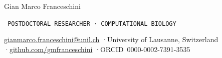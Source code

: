\documentclass[9.5pt, a4paper]{article}
\begin{document}
{\fontsize{28pt}{30pt}\selectfont\rmfamily Gian Marco Franceschini}

\vspace{5pt}
{\fontsize{6.5pt}{8pt}\selectfont\texttt{\textcolor{ac}{%
  POSTDOCTORAL RESEARCHER · COMPUTATIONAL BIOLOGY%
}}}

\vspace{5pt}
{\fontsize{8pt}{10pt}\selectfont\textcolor{mu}{%
  \href{mailto:gianmarco.franceschini@unil.ch}{gianmarco.franceschini@unil.ch}%
  \enspace·\enspace University of Lausanne, Switzerland%
  \enspace·\enspace \href{https://github.com/gmfranceschini}{github.com/gmfranceschini}%
  \enspace·\enspace ORCID~0000-0002-7391-3535%
}}

\vspace{3pt}

\end{document}
